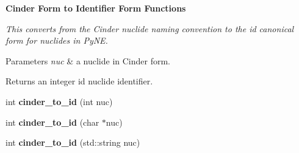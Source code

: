 \begin{Indent}{\bf Cinder Form to Identifier Form Functions}\par
{\em This converts from the Cinder nuclide naming convention to the id canonical form for nuclides in Py\+N\+E. 
\begin{DoxyParams}{Parameters}
{\em nuc} & a nuclide in Cinder form. \\
\hline
\end{DoxyParams}
\begin{DoxyReturn}{Returns}
an integer id nuclide identifier. 
\end{DoxyReturn}
}\begin{DoxyCompactItemize}
\item 
\hypertarget{namespacepyne_1_1nucname_a5c016b1b66515eb8050137ac45afdfd0}{int {\bfseries cinder\+\_\+to\+\_\+id} (int nuc)}\label{namespacepyne_1_1nucname_a5c016b1b66515eb8050137ac45afdfd0}

\item 
\hypertarget{namespacepyne_1_1nucname_a0f8028aedef58c8ee70f24ecfa4f8c72}{int {\bfseries cinder\+\_\+to\+\_\+id} (char $\ast$nuc)}\label{namespacepyne_1_1nucname_a0f8028aedef58c8ee70f24ecfa4f8c72}

\item 
\hypertarget{namespacepyne_1_1nucname_a72bc35fb19b1cfd3dc8a11d9a8963d4a}{int {\bfseries cinder\+\_\+to\+\_\+id} (std\+::string nuc)}\label{namespacepyne_1_1nucname_a72bc35fb19b1cfd3dc8a11d9a8963d4a}

\end{DoxyCompactItemize}
\end{Indent}
